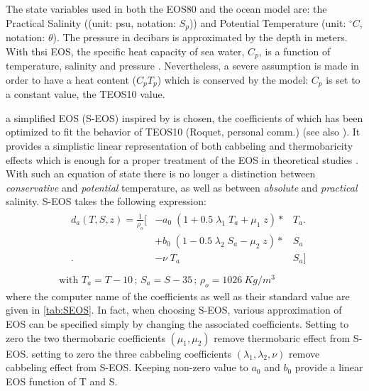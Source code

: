 \documentclass[../main/NEMO_manual]{subfiles}
\begin{document}
\begin{description}
  The state variables used in both the EOS80 and the ocean model are:
  the Practical Salinity ((unit: psu, notation: $S_p$)) and
  Potential Temperature (unit: $^{\circ}C$, notation: $\theta$).
  The pressure in decibars is approximated by the depth in meters.
  With thsi EOS, the specific heat capacity of sea water, $C_p$, is a function of temperature, salinity and
  pressure \citep{UNESCO1983}.
  Nevertheless, a severe assumption is made in order to have a heat content ($C_p T_p$) which
  is conserved by the model: $C_p$ is set to a constant value, the TEOS10 value.
\item[\np{nn\_eos}~\forcode{= 1}]
  a simplified EOS (S-EOS) inspired by \citet{Vallis06} is chosen,
  the coefficients of which has been optimized to fit the behavior of TEOS10
  (Roquet, personal comm.) (see also \citet{Roquet_JPO2015}).
  It provides a simplistic linear representation of both cabbeling and thermobaricity effects which
  is enough for a proper treatment of the EOS in theoretical studies \citep{Roquet_JPO2015}.
  With such an equation of state there is no longer a distinction between
  \textit{conservative} and \textit{potential} temperature,
  as well as between \textit{absolute} and \textit{practical} salinity.
  S-EOS takes the following expression:
  \begin{gather*}
    \begin{alignedat}{2}
    &d_a(T,S,z) = \frac{1}{\rho_o} \big[ &- a_0 \; ( 1 + 0.5 \; \lambda_1 \; T_a + \mu_1 \; z ) * &T_a \big. \\
    &                                    &+ b_0 \; ( 1 - 0.5 \; \lambda_2 \; S_a - \mu_2 \; z ) * &S_a       \\  
    &                              \big. &- \nu \;                           T_a                  &S_a \big] \\
    \end{alignedat}
    \\
    \text{with~} T_a = T - 10 \, ; \, S_a = S - 35 \, ; \, \rho_o = 1026~Kg/m^3
  \end{gather*}
  where the computer name of the coefficients as well as their standard value are given in \autoref{tab:SEOS}.
  In fact, when choosing S-EOS, various approximation of EOS can be specified simply by
  changing the associated coefficients.
  Setting to zero the two thermobaric coefficients $(\mu_1,\mu_2)$ remove thermobaric effect from S-EOS.
  setting to zero the three cabbeling coefficients $(\lambda_1,\lambda_2,\nu)$ remove cabbeling effect from
  S-EOS.
  Keeping non-zero value to $a_0$ and $b_0$ provide a linear EOS function of T and S.
\end{description}
\end{document}
